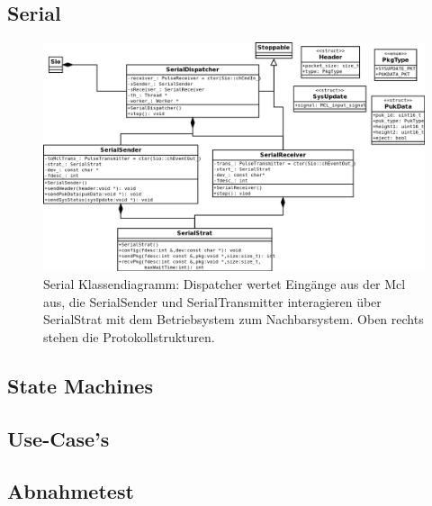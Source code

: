 \documentclass[
   draft=false
  ,paper=a4
  ,twoside=true
  ,fontsize=11pt
  ,headsepline
  ,DIV11
  ,parskip=full+
]{scrartcl} %
\begin{document}
\subsection{Serial}
\begin{figure}[H]
  	\centering
    \includegraphics[width=\textwidth]{./IMG/serial.png}
    \caption[Seriallayer]{Serial Klassendiagramm: Dispatcher wertet Eingänge aus der Mcl aus, die SerialSender und SerialTransmitter interagieren über SerialStrat mit dem Betriebsystem zum Nachbarsystem. Oben rechts stehen die Protokollstrukturen.}
     \label{fig:serial}
\end{figure}
\subsection{State Machines}

\subsection{Use-Case's}

\subsection{Abnahmetest }

\end{document}
